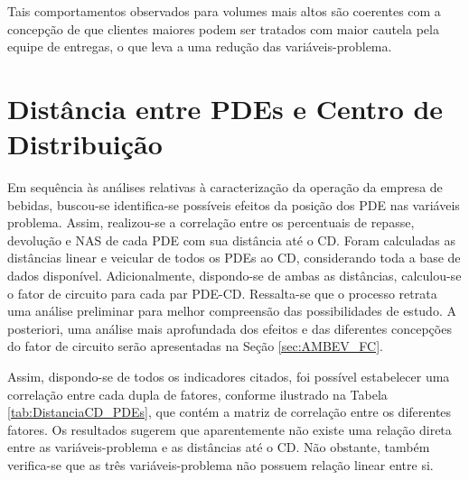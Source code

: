 Tais comportamentos observados para volumes mais altos são coerentes com a concepção de que clientes maiores podem ser tratados com maior cautela pela equipe de entregas, o que leva a uma redução das variáveis-problema.

\section{Distância entre PDEs e Centro de Distribuição} \label{sec:distanciaCDBebidas}

Em sequência às análises relativas à caracterização da operação da empresa de bebidas, buscou-se identifica-se possíveis efeitos da posição dos PDE nas variáveis problema. Assim, realizou-se a correlação entre os percentuais de repasse, devolução e NAS de cada PDE com sua distância até o CD. 
Foram calculadas as distâncias linear e veicular de todos os PDEs ao CD, considerando toda a base de dados disponível.
Adicionalmente, dispondo-se de ambas as distâncias, calculou-se o fator de circuito para cada par PDE-CD.
Ressalta-se que o processo retrata uma análise preliminar para melhor compreensão das possibilidades de estudo. A posteriori, uma análise mais aprofundada dos efeitos e das diferentes concepções do fator de circuito serão apresentadas na Seção \ref{sec:AMBEV_FC}.

Assim, dispondo-se de todos os indicadores citados, foi possível estabelecer uma correlação entre cada dupla de fatores, conforme ilustrado na Tabela \ref{tab:DistanciaCD_PDEs}, que contém a matriz de correlação entre os diferentes fatores.
Os resultados sugerem que aparentemente não existe uma relação direta entre as variáveis-problema e as distâncias até o CD.
Não obstante, também verifica-se que as três variáveis-problema não possuem relação linear entre si.


